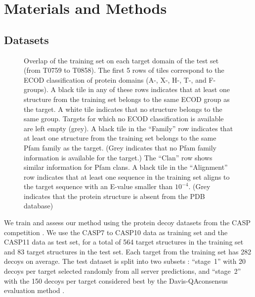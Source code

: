 \documentclass{bioinfo}
\begin{document}
\section{Materials and Methods}

\subsection{Datasets}
\begin{figure}[!tpb]
    \caption{Overlap of the training set on each target domain of the
    test set (from T0759 to T0858). The first 5 rows of tiles
    correspond to the ECOD classification of protein domains (A-, X-,
    H-, T-, and F-groups). A black tile in any of these rows indicates
    that at least one structure from the training set belongs to the
    same ECOD group as the target. A white tile indicates that no
    structure belongs to the same group. Targets for which no ECOD
    classification is available are left empty (grey).
    A black tile in the ``Family'' row indicates that at least one
    structure from the training set belongs to the same Pfam family as
    the target. (Grey indicates that no Pfam family information is
    available for the target.) The ``Clan'' row shows similar
    information for Pfam clans. A black tile in the ``Alignment'' row
    indicates that at least one sequence in the training set aligns to
    the target sequence with an E-value smaller than $10^{-4}$. (Grey
    indicates that the protein structure is absent from the PDB database)}
    \label{Fig:summaryTable}
\end{figure}
We train and assess our method using the protein decoy datasets from
the CASP competition \citep{moult2014critical}.  We use the CASP7 to
CASP10 data as training set and the CASP11 data as test set, for a
total of 564 target structures in the training set and 83 target
structures in the test set. Each target from the training set has 282
decoys on average.
The test dataset is split into two subsets \citep{kryshtafovych2015}:
``stage~1'' with 20 decoys per target selected randomly from all
server predictions, and ``stage~2'' with the 150 decoys per target
considered best by the Davis-QAconsensus evaluation
method \citep{kryshtafovych2015}.
\end{document}
